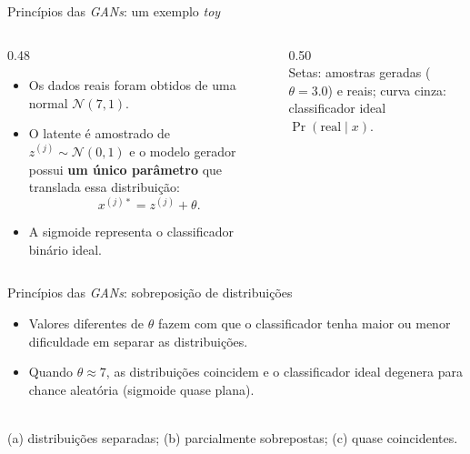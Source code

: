 \documentclass[aspectratio=169,xcolor=dvipsnames]{beamer}
\begin{document}
  \begin{frame}{Princípios das \textit{GANs}: um exemplo \textit{toy}}
    \begin{columns}[T]
      \begin{column}{0.48\textwidth}
        \begin{itemize}
          \item Os dados reais foram obtidos de uma normal
          $\mathcal{N}(7,1)$.
          \item O latente é amostrado de $z^{(j)} \sim \mathcal{N}(0,1)$
          e o modelo gerador possui \textbf{um único parâmetro} que
          translada essa distribuição:
          \[
            x^{(j)*} = z^{(j)} + \theta.
          \]
          \item A sigmoide representa o classificador binário ideal.
        \end{itemize}
      \end{column}
      \begin{column}{0.50\textwidth}
        \centering
        \gantoysinglefigure\\
        \tiny Setas: amostras geradas ($\theta=3.0$) e reais; curva cinza:
        classificador ideal $\Pr(\text{real}\mid x)$.
      \end{column}
    \end{columns}
  \end{frame}

  \begin{frame}{Princípios das \textit{GANs}: sobreposição de distribuições}
    \begin{itemize}
      \item Valores diferentes de $\theta$ fazem com que o classificador
      tenha maior ou menor dificuldade em separar as distribuições.
      \item Quando $\theta \approx 7$, as distribuições coincidem e o
      classificador ideal degenera para chance aleatória (sigmoide
      quase plana).
    \end{itemize}
    \centering
    \resizebox{0.92\linewidth}{!}{\gantoypanelsfigure}\\
    \tiny (a) distribuições separadas; (b) parcialmente sobrepostas;
    (c) quase coincidentes.
  \end{frame}
\end{document}
